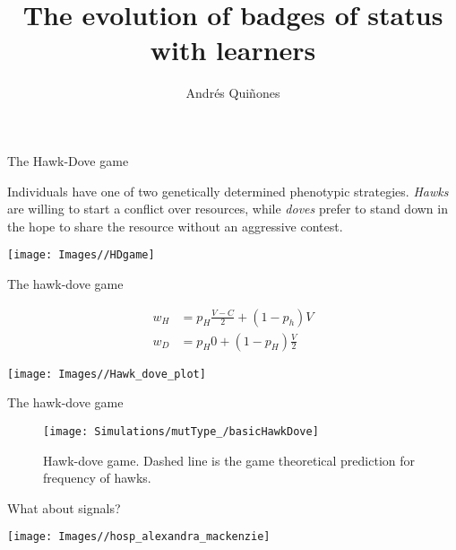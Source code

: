 \documentclass[ignorenonframetext,]{beamer}
\title{The evolution of badges of status with learners}
\author{Andrés Quiñones}
\date{}
\begin{document}
\frame{\titlepage}

\begin{frame}{The Hawk-Dove game}

Individuals have one of two genetically determined phenotypic
strategies. \emph{Hawks} are willing to start a conflict over resources,
while \emph{doves} prefer to stand down in the hope to share the
resource without an aggressive contest.

\begin{center}\texttt{[image: Images//HDgame]} \end{center}

\end{frame}

\begin{frame}{The hawk-dove game}

\begin{align*}
w_H &= p_H \frac{V-C}{2}+(1-p_h) V\\
w_D &= p_H 0 + (1-p_H)\frac{V}{2}
\end{align*}

\vspace{-0.8cm}

\begin{center}\texttt{[image: Images//Hawk\_dove\_plot]} \end{center}

\end{frame}

\begin{frame}{The hawk-dove game}

\begin{figure}
\texttt{[image: Simulations/mutType\_/basicHawkDove]} \caption{\label{fig:HD_game}Hawk-dove game. Dashed line is the  game theoretical prediction for frequency of hawks.}\label{fig:unnamed-chunk-3}
\end{figure}

\end{frame}

\begin{frame}{What about signals?}

\begin{center}\texttt{[image: Images//hosp\_alexandra\_mackenzie]} \end{center}

\end{frame}
\end{document}
